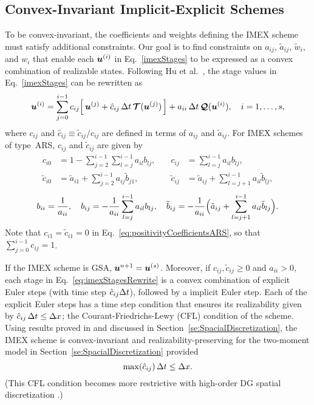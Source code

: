 \subsection{Convex-Invariant Implicit-Explicit Schemes}

To be convex-invariant, the coefficients and weights defining the IMEX scheme must satisfy additional constraints.
Our goal is to find constraints on $a_{ij}$, $\tilde{a}_{ij}$, $\tilde{w}_{i}$, and $w_{i}$ that enable each $\boldsymbol{u}^{(i)}$ in Eq.~\eqref{imexStages} to be expressed as a convex combination of realizable states.  
Following Hu et al.~\cite{hu_etal_2018}, the stage values in Eq.~\eqref{imexStages} can be rewritten as
\begin{equation}
  \boldsymbol{u}^{(i)}
  =\sum_{j=0}^{i-1}c_{ij}\Big[\,\boldsymbol{u}^{(j)}+\hat{c}_{ij}\,\Delta t\,\boldsymbol{\mathcal{T}}(\boldsymbol{u}^{(j)})\,\Big] + a_{ii}\,\Delta t\,\boldsymbol{\mathcal{Q}}(\boldsymbol{u}^{(i)}),\quad i=1,\ldots,s,
  \label{eq:imexStagesRewrite}
\end{equation}
where $c_{ij}$ and $\hat{c}_{ij}\equiv\tilde{c}_{ij}/c_{ij}$ are defined in terms of $a_{ij}$ and $\tilde{a}_{ij}$.
For IMEX schemes of type~ARS, $c_{ij}$ and $\tilde{c}_{ij}$ are given by
    \begin{equation}
     \begin{aligned}
      c_{i0} &= 1-\sum_{j=2}^{i-1}\sum_{l=j}^{i-1}a_{il}b_{lj}, \quad &
      c_{ij} &= \sum_{l=j}^{i-1}a_{il}b_{lj}, \\
      \tilde{c}_{i0} &= \tilde{a}_{i1}+\sum_{j=2}^{i-1}a_{ij}\tilde{b}_{j1}, \quad &
      \tilde{c}_{ij} &= \tilde{a}_{ij}+\sum_{l=j+1}^{i-1}a_{il}\tilde{b}_{lj},  
     \end{aligned}
     \label{eq:positivityCoefficientsARS}
    \end{equation}
    \begin{equation}
      b_{ii} = \frac{1}{a_{ii}}, \quad
      b_{ij} = -\frac{1}{a_{ii}}\sum_{l=j}^{i-1}a_{il}b_{lj}, \quad
      \tilde{b}_{ij} = -\frac{1}{a_{ii}}\Big(\tilde{a}_{ij}+\sum_{l=j+1}^{i-1}a_{il}\tilde{b}_{lj}\Big).  
    \end{equation}
Note that $c_{i1}=\tilde{c}_{i1}=0$ in Eq.~\eqref{eq:positivityCoefficientsARS}, so that $\sum_{j=0}^{i-1}c_{ij}=1$.

If the IMEX scheme is GSA, $\boldsymbol{u}^{n+1} = \boldsymbol{u}^{(s)}$.  
Moreover, if $c_{ij},\tilde{c}_{ij}\ge0$ and $a_{ii}>0$, each stage in Eq.~\eqref{eq:imexStagesRewrite} is a convex combination of explicit Euler steps (with time step $\hat{c}_{ij}\Delta t$), followed by a implicit Euler step.  
Each of the explicit Euler steps has a time step condition that ensures its realizability given by $\hat{c}_{ij}\,\Delta t\leq\Delta x$; the Courant-Friedrichs-Lewy (CFL) condition of the scheme.
Using results proved in \cite{chu_etal_2018} and discussed in Section~\ref{se:SpacialDiscretization}, the IMEX scheme is convex-invariant and realizability-preserving for the two-moment model in Section~\ref{se:SpacialDiscretization} provided
\begin{equation}
  \max(\hat{c}_{ij})\,\Delta t \leq \Delta x.  
\end{equation}
(This CFL condition becomes more restrictive with high-order DG spatial discretization \cite{chu_etal_2018}.)

